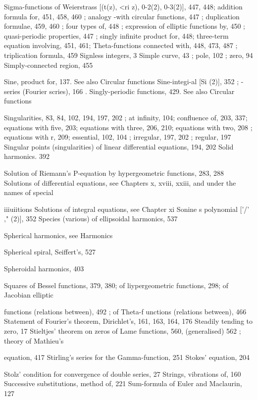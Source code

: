 Sigma-functions of Weierstrass [(t(z), <ri z), 0-2(2), 0-3(2)], 447, 448; addition formula for, 451,
458, 460 ; analogy -with circular functions, 447 ; duplication formulae, 459, 460 ; four
types of, 448 ; expression of elliptic functions by, 450 ; quasi-periodic properties, 447 ;
singly infinite product for, 448; three-term equation involving, 451, 461; Theta-functions
connected with, 448, 473, 487 ; triplication formula, 459
Signless integers, 3
Simple curve, 43 ; pole, 102 ; zero, 94
Simply-connected region, 455

Sine, product for, 137. See also Circular functions
Sine-integi-al [Si (2)], 352 ; -series (Fourier scries), 166 .
Singly-periodic functions, 429. See also Circular functions

Singularities, 83, 84, 102, 194, 197, 202 ; at infinity, 104; confluence of, 203, 337; equations
with five, 203; equations with three, 206, 210; equations with two, 208 ; equations with r,
209; essential, 102, 104 ; irregular, 197, 202 ; regular, 197
Singular points (singularities) of linear differential equations, 194, 202
Solid harmonics. 392

Solution of Riemann's P-equation by hypergeometric functions, 283, 288
Solutions of differential equations, see Chapters x, xviii, xxiii, and under the names of special

iiiuiitions
Solutions of integral equations, see Chapter xi
Sonine s polynomial ['/' ," (2)], 352
Species (various) of ellipsoidal harmonics, 537

%
%

Spherical harmonics, see Harmonics

Spherical spiral, Seiffert's, 527

Spheroidal harmonics, 403

Squares of Bessel functions, 379, 380; of liypergeometric functions, 298; of Jacobian elliptic

functions (relations between), 492 ; of Theta-f unctions (relations between), 466
Statement of Fourier's theorem, Dirichlet's, 161, 163, 164, 176
Steadily tending to zero, 17
Stieltjes' theorem on zeros of Lame functions, 560, (generalised) 562 ; theory of Mathieu's

equation, 417
Stirling's series for the Gamma-function, 251
Stokes' equation, 204

Stolz' condition for convergence of double series, 27
Strings, vibrations of, 160
Successive substitutions, method of, 221
Sum-formula of Euler and Maclaurin, 127

